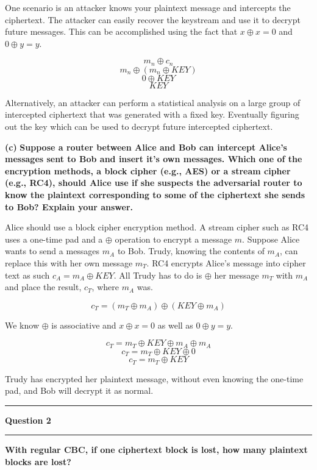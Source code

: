 \documentclass[11pt]{article}
\newcommand\question[2]{\vspace{.25in}\hrule\textbf{#1}\vspace{.5em}\hrule\vspace{.10in}}
\renewcommand\part[1]{\vspace{.10in}\textbf{(#1)}}
\begin{document}
One scenario is an attacker knows your plaintext message and intercepts the ciphertext. The attacker can easily recover the keystream and use it to decrypt future messages. This can be accomplished using the fact that $x \oplus x = 0$ and $0 \oplus y = y$. 

$$m_n \oplus c_n$$
$$m_n \oplus (m_n \oplus KEY)$$
$$0 \oplus KEY$$
$$KEY$$

Alternatively, an attacker can perform a statistical analysis on a large group of intercepted ciphertext that was generated with a fixed key. Eventually figuring out the key which can be used to decrypt future intercepted ciphertext.

\part{c} \textbf{Suppose a router between Alice and Bob can intercept Alice's messages sent to Bob and insert it's own messages. Which one of the encryption methods, a block cipher (e.g., AES) or a stream cipher (e.g., RC4), should Alice use if she suspects the adversarial router to know the plaintext corresponding to some of the ciphertext she sends to Bob? Explain your answer.} \newline

Alice should use a block cipher encryption method. A stream cipher such as RC4 uses a one-time pad and a $\oplus$ operation to encrypt a message $m$. Suppose Alice wants to send a messages $m_A$ to Bob. Trudy, knowing the contents of $m_A$, can replace this with her own message $m_T$. RC4 encrypts Alice's message into cipher text as such $c_A = m_A \oplus KEY$. All Trudy has to do is $\oplus$ her message $m_T$ with $m_A$ and place the result, $c_T$, where $m_A$ was.

	$$c_T = (m_T \oplus m_A) \oplus (KEY \oplus m_A)$$

We know $\oplus$ is associative and $x \oplus x = 0$ as well as $0 \oplus y = y$. 

$$c_T = m_T \oplus KEY \oplus m_A \oplus m_A$$
$$c_T = m_T \oplus KEY \oplus 0$$
$$c_T = m_T \oplus KEY$$

Trudy has encrypted her plaintext message, without even knowing the one-time pad, and Bob will decrypt it as normal.

\question{Question 2}

\part{a} \textbf{With regular CBC, if one ciphertext block is lost, how many plaintext blocks are lost?} \newline
\end{document}

